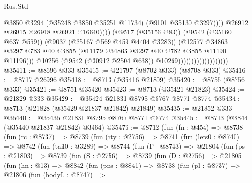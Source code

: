 \begin{lexlean}{RustStd}
\begin{coremodule}
                                                          @3850
                                                          @3294
                                                          (@35248 @3850 @35251 @11734)
                                                          (@9101 @35130 @3297))))
                                                    @26912
                                                    @26915
                                                    @26918
                                                    @26921
                                                    @16640))))
                                            (@9517 (@35156 @83))
                                            (@9542 (@35160 @637 @569))
                                            (@9037 (@35167 @569 @459 @4404 @3283))
                                            (@12577
                                              @34863
                                              @3297
                                              @783
                                              @40
                                              @3855
                                              (@11179 @34863 @3297 @40 @782 @3855 @11190 @11196)))
                                          @10256
                                          (@9542 (@30912 @2504 @638))
                                          @10269)))))))))))))))))))
@35411 := @8696 @333
@35415 := @21797 (@8702 @333) (@8708 @333)
@35416 := @8717 @26996
@35418 := @8713 (@35416 @21809)
@35420 := @8755 (@8756 @333)
@35421 := @8751 @35420
@35423 := @8713 (@35421 @21823)
@35424 := @21829 @333
@35429 := @35424 @21831 @8795 @8767 @8771 @8774
@35434 := @8713 (@21828 (@35429 @21837 @21842) @21849)
@35435 := @21852 @333
@35440 := @35435 @21831 @8795 @8767 @8771 @8774
@35445 := @8713 (@8844 (@35440 @21837 @21842) @3464)
@35476 := @8712
    (fun (fn : @454) =>
    @8738
      (fun (rc : @8737) =>
      @8739
        (fun (rty : @2756) =>
        @8741
          (fun (lets0 : @8740) =>
          @8742
            (fun (tail0 : @3289) =>
            @8744
              (fun (Γ : @8743) =>
              @21804
                (fun (ps : @21803) =>
                @8739
                  (fun (S : @2756) =>
                  @8739
                    (fun (D : @2756) =>
                    @21805
                      (fun (hn : @13) =>
                      @8842
                        (fun (pns : @8841) =>
                        @8738
                          (fun (pl : @8737) =>
                          @21806
                            (fun (bodyL : @8747) =>

\end{coremodule}
\end{lexlean}
